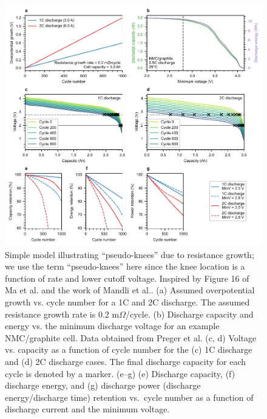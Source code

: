 \documentclass[journal=jpclcd,manuscript=article]{achemso}
\begin{document}
\begin{figure}[p]
\centering
\includegraphics[scale = 1]{final_figures/resistance_growth_knee_2.pdf}
\caption{Simple model illustrating ``pseudo-knees'' due to resistance growth; we use the term ``pseudo-knees'' here since the knee location is a function of rate and lower cutoff voltage. Inspired by Figure 16 of Ma et al.\cite{ma_editors_2019} and the work of Mandli et al.\cite{mandli_analysis_2019}. (a) Assumed overpotential growth vs. cycle number for a 1C and 2C discharge. The assumed resistance growth rate is 0.2 m$\Omega$/cycle. (b) Discharge capacity and energy vs. the minimum discharge voltage for an example NMC/graphite cell. Data obtained from Preger et al.\cite{preger_degradation_2020} (c, d) Voltage vs. capacity as a function of cycle number for the (c) 1C discharge and (d) 2C discharge cases. The final discharge capacity for each cycle is denoted by a marker. (e--g) (e) Discharge capacity, (f) discharge energy, and (g) discharge power (discharge energy/discharge time) retention vs.\ cycle number as a function of discharge current and the minimum voltage.
}
\label{fig:dcr_knee}
\end{figure}
\end{document}
